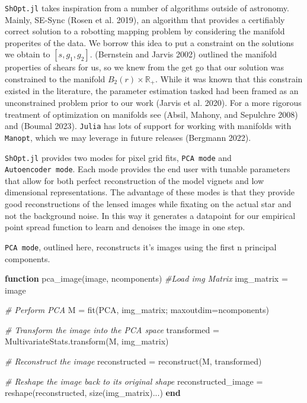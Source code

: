 \documentclass[
]{article}
\newenvironment{Shaded}{}{}
\newcommand{\CommentTok}[1]{\textcolor[rgb]{0.38,0.63,0.69}{\textit{#1}}}
\newcommand{\KeywordTok}[1]{\textcolor[rgb]{0.00,0.44,0.13}{\textbf{#1}}}
\newcommand{\NormalTok}[1]{#1}
\newcommand{\OperatorTok}[1]{\textcolor[rgb]{0.40,0.40,0.40}{#1}}
\begin{document}
\texttt{ShOpt.jl} takes inspiration from a number of algorithms outside
of astronomy. Mainly, SE-Sync (Rosen et al. 2019), an algorithm that
provides a certifiably correct solution to a robotting mapping problem
by considering the manifold properites of the data. We borrow this idea
to put a constraint on the solutions we obtain to \([s, g_1, g_2]\).
(Bernstein and Jarvis 2002) outlined the manifold properties of shears
for us, so we knew from the get go that our solution was constrained to
the manifold \(B_2(r) \times \mathbb{R}_{+}\). While it was known that
this constrain existed in the literature, the parameter estimation
tasked had been framed as an unconstrained problem prior to our work
(Jarvis et al. 2020). For a more rigorous treatment of optimization on
manifolds see (Absil, Mahony, and Sepulchre 2008) and (Boumal 2023).
\texttt{Julia} has lots of support for working with manifolds with
\texttt{Manopt}, which we may leverage in future releases (Bergmann
2022).

\texttt{ShOpt.jl} provides two modes for pixel grid fits,
\texttt{PCA\ mode} and \texttt{Autoencoder\ mode}. Each mode provides
the end user with tunable parameters that allow for both perfect
reconstruction of the model vignets and low dimensional representations.
The advantage of these modes is that they provide good reconstructions
of the lensed images while fixating on the actual star and not the
background noise. In this way it generates a datapoint for our empirical
point spread function to learn and denoises the image in one step.

\texttt{PCA\ mode}, outlined here, reconstructs it's images using the
first n principal components.

\begin{Shaded}
\begin{Highlighting}[]
\KeywordTok{function}\NormalTok{ pca\_image(image}\OperatorTok{,}\NormalTok{ ncomponents)    }
  \CommentTok{\#Load img Matrix}
\NormalTok{  img\_matrix }\OperatorTok{=}\NormalTok{ image}
    
  \CommentTok{\# Perform PCA    }
\NormalTok{  M }\OperatorTok{=}\NormalTok{ fit(PCA}\OperatorTok{,}\NormalTok{ img\_matrix}\OperatorTok{;}\NormalTok{ maxoutdim}\OperatorTok{=}\NormalTok{ncomponents)    }
    
  \CommentTok{\# Transform the image into the PCA space    }
\NormalTok{  transformed }\OperatorTok{=}\NormalTok{ MultivariateStats.transform(M}\OperatorTok{,}\NormalTok{ img\_matrix)    }
    
  \CommentTok{\# Reconstruct the image    }
\NormalTok{  reconstructed }\OperatorTok{=}\NormalTok{ reconstruct(M}\OperatorTok{,}\NormalTok{ transformed)    }
    
  \CommentTok{\# Reshape the image back to its original shape    }
\NormalTok{  reconstructed\_image }\OperatorTok{=}\NormalTok{ reshape(reconstructed}\OperatorTok{,}\NormalTok{ size(img\_matrix)}\OperatorTok{...}\NormalTok{)    }
\KeywordTok{end}    
\end{Highlighting}
\end{Shaded}
\end{document}
